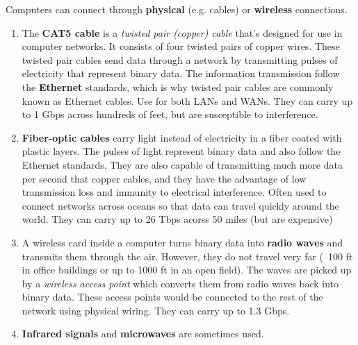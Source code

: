 \documentclass{article}
\begin{document}
  Computers can connect through \textbf{physical} (e.g. cables) or \textbf{wireless} connections. 
  \begin{enumerate}
      \item The \textbf{CAT5 cable} is a \textit{twisted pair (copper) cable} that's designed for use in computer networks. It consists of four twisted pairs of copper wires. These twisted pair cables send data through a network by transmitting pulses of electricity that represent binary data. The information transmission follow the \textbf{Ethernet} standards, which is why twisted pair cables are commonly known as Ethernet cables. Use for both LANs and WANs. They can carry up to 1 Gbps across hundreds of feet, but are susceptible to interference. 
      \item \textbf{Fiber-optic cables} carry light instead of electricity in a fiber coated with plastic layers. The pulses of light represent binary data and also follow the Ethernet standards. They are also capable of transmitting much more data per second that copper cables, and they have the advantage of low transmission loss and immunity to electrical interference. Often used to connect networks across oceans so that data can travel quickly around the world. They can carry up to 26 Tbps acorss 50 miles (but are expensive)
      \item A wireless card inside a computer turns binary data into \textbf{radio waves} and transmits them through the air. However, they do not travel very far (~100 ft in office buildings or up to 1000 ft in an open field). The waves are picked up by a \textit{wireless access point} which converts them from radio waves back into binary data. These access points would be connected to the rest of the network using physical wiring. They can carry up to 1.3 Gbps. 
      \item \textbf{Infrared signals} and \textbf{microwaves} are sometimes used. 
  \end{enumerate}
\end{document}

